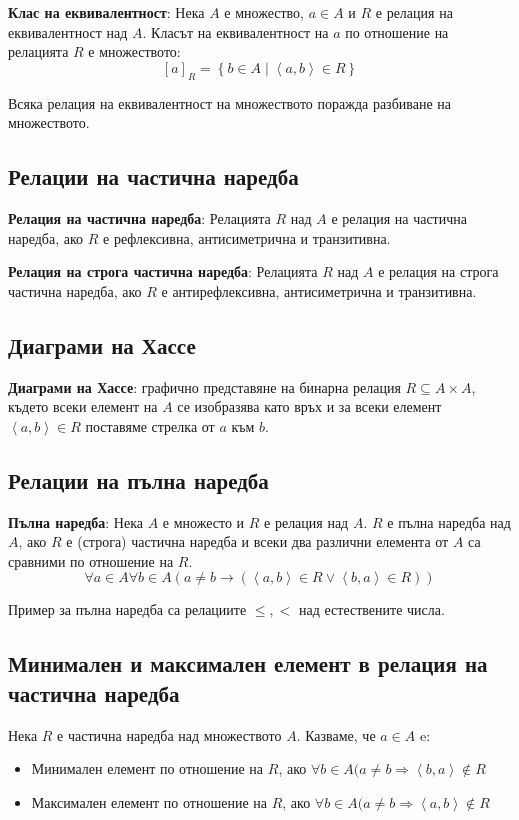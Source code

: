 \documentclass{article}
\renewcommand{\\}{\newline}
\newcommand{\sep}{\;|\;}
\begin{document}
    \textbf{Клас на еквивалентност}: Нека \(A\) е множество, \(a \in A\) и \(R\) е релация на еквивалентност над \(A\). Класът на еквивалентност на \(a\) по отношение на релацията \(R\) е множеството: \[
      [a]_{R} = \left\{b \in A \sep \left\langle a, b\right\rangle\in R\right\}
    \]        

    Всяка релация на еквивалентност на множеството поражда разбиване на множеството.
  

    \subsection{Релации на частична наредба }
    \textbf{Релация на частична наредба}: Релацията \(R\) над \(A\) е релация на частична наредба, ако \(R\) е рефлексивна, антисиметрична и транзитивна.    

    \textbf{Релация на строга частична наредба}: Релацията \(R\) над \(A\) е релация на строга частична наредба, ако \(R\) е антирефлексивна, антисиметрична и транзитивна.    

    \subsection{Диаграми на Хассе }
    \textbf{Диаграми на Хассе}: графично представяне на бинарна релация \(R \subseteq A \times A\), където всеки елемент на \(A\) се изобразява като връх и за всеки елемент \(\left\langle a, b\right\rangle \in R\) поставяме стрелка от \(a\) към \(b\).      

    \subsection{Релации на пълна наредба }
    \textbf{Пълна наредба}: Нека \(A\) е множесто и \(R\) е релация над \(A\). \(R\) е пълна наредба над \(A\), ако \(R\) е (строга) частична наредба и всеки два различни елемента от \(A\) са сравними по отношение на \(R\). 
    \[
      \forall a \in A \forall b \in A (a \not=b \rightarrow (\left\langle a,b \right\rangle \in R \lor \left\langle b, a\right\rangle \in R))
    \] 

    Пример за пълна наредба са релациите \(\leq, <\) над естествените числа.  

    \subsection{Минимален и максимален елемент в релация на частична наредба }
    Нека \(R\) е частична наредба над множеството \(A\). Казваме, че \(a \in A\) e:
    \begin{itemize}
        \item Минимален елемент по отношение на \(R\), ако \(\forall b \in A (a \not= b \Rightarrow \left\langle b, a\right\rangle \not \in R\)   
        \item Максимален елемент по отношение на \(R\), ако \(\forall b \in A (a \not= b \Rightarrow \left\langle a, b \right\rangle \not \in R\)   
    \end{itemize}
\end{document}
